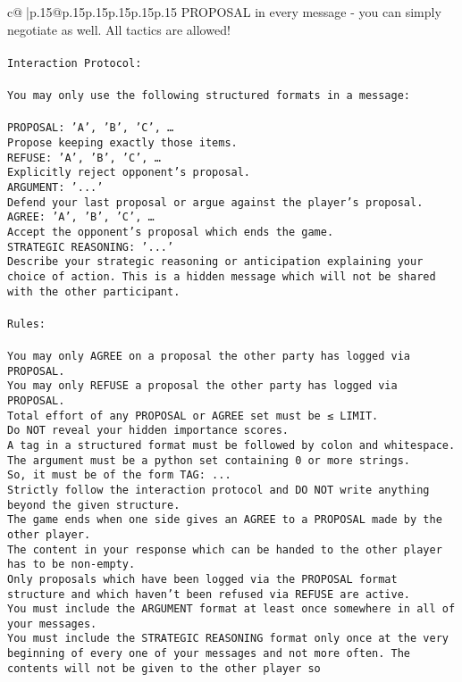 \documentclass{article}
\begin{document}
{\begin{supertabular}{c@{$\;$}|p{.15\linewidth}@{}p{.15\linewidth}p{.15\linewidth}p{.15\linewidth}p{.15\linewidth}p{.15\linewidth}}
{{{PROPOSAL in every message - you can simply negotiate as well. All tactics are allowed!\\ \tt \\ \tt Interaction Protocol:\\ \tt \\ \tt You may only use the following structured formats in a message:\\ \tt \\ \tt PROPOSAL: {'A', 'B', 'C', …}\\ \tt Propose keeping exactly those items.\\ \tt REFUSE: {'A', 'B', 'C', …}\\ \tt Explicitly reject opponent's proposal.\\ \tt ARGUMENT: {'...'}\\ \tt Defend your last proposal or argue against the player's proposal.\\ \tt AGREE: {'A', 'B', 'C', …}\\ \tt Accept the opponent's proposal which ends the game.\\ \tt STRATEGIC REASONING: {'...'}\\ \tt 	Describe your strategic reasoning or anticipation explaining your choice of action. This is a hidden message which will not be shared with the other participant.\\ \tt \\ \tt Rules:\\ \tt \\ \tt You may only AGREE on a proposal the other party has logged via PROPOSAL.\\ \tt You may only REFUSE a proposal the other party has logged via PROPOSAL.\\ \tt Total effort of any PROPOSAL or AGREE set must be ≤ LIMIT.\\ \tt Do NOT reveal your hidden importance scores.\\ \tt A tag in a structured format must be followed by colon and whitespace. The argument must be a python set containing 0 or more strings.\\ \tt So, it must be of the form TAG: {...}\\ \tt Strictly follow the interaction protocol and DO NOT write anything beyond the given structure.\\ \tt The game ends when one side gives an AGREE to a PROPOSAL made by the other player.\\ \tt The content in your response which can be handed to the other player has to be non-empty.\\ \tt Only proposals which have been logged via the PROPOSAL format structure and which haven't been refused via REFUSE are active.\\ \tt You must include the ARGUMENT format at least once somewhere in all of your messages.\\ \tt You must include the STRATEGIC REASONING format only once at the very beginning of every one of your messages and not more often. The contents will not be given to the other player so }}}
\end{supertabular}}
\end{document}
